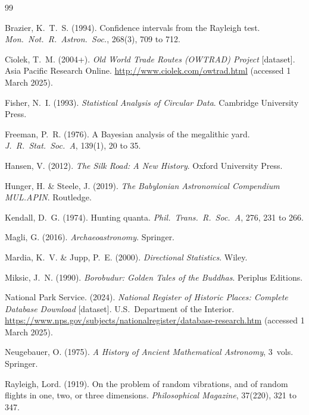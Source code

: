 \documentclass[12pt,a4paper]{article}
\begin{document}
\begin{thebibliography}{99}

Brazier, K.~T.~S. (1994). Confidence intervals from the Rayleigh test.
\textit{Mon.\ Not.\ R.\ Astron.\ Soc.}, 268(3), 709 to 712.

Ciolek, T.~M. (2004+). \textit{Old World Trade Routes (OWTRAD) Project}
[dataset]. Asia Pacific Research Online.
\url{http://www.ciolek.com/owtrad.html} (accessed 1 March 2025).

Fisher, N.~I. (1993). \textit{Statistical Analysis of Circular Data}.
Cambridge University Press.

Freeman, P.~R. (1976). A Bayesian analysis of the megalithic yard.
\textit{J.\ R.\ Stat.\ Soc.\ A}, 139(1), 20 to 35.

Hansen, V. (2012). \textit{The Silk Road: A New History}.
Oxford University Press.

Hunger, H. \& Steele, J. (2019).
\textit{The Babylonian Astronomical Compendium MUL.APIN}. Routledge.

Kendall, D.~G. (1974). Hunting quanta.
\textit{Phil.\ Trans.\ R.\ Soc.\ A}, 276, 231 to 266.

Magli, G. (2016). \textit{Archaeoastronomy}. Springer.

Mardia, K.~V. \& Jupp, P.~E. (2000). \textit{Directional Statistics}.
Wiley.

Miksic, J.~N. (1990). \textit{Borobudur: Golden Tales of the Buddhas}.
Periplus Editions.

{National Park Service}. (2024). \textit{National Register of Historic
Places: Complete Database Download} [dataset]. U.S.\ Department of the Interior.
\url{https://www.nps.gov/subjects/nationalregister/database-research.htm}
(accessed 1 March 2025).

Neugebauer, O. (1975). \textit{A History of Ancient Mathematical
Astronomy}, 3~vols. Springer.

Rayleigh, Lord. (1919). On the problem of random vibrations, and of
random flights in one, two, or three dimensions.
\textit{Philosophical Magazine}, 37(220), 321 to 347.


\end{thebibliography}
\end{document}
